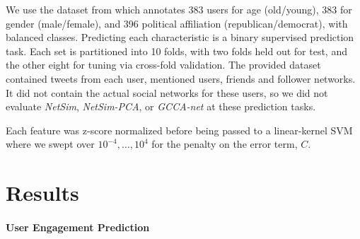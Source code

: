\documentclass{article}
\newcommand{\gccawnet}{\emph{GCCA-net}} %
\newcommand{\bowpcawnet}{\emph{NetSim-PCA}} %
\newcommand{\collab}{\emph{NetSim}} %
\newcommand{\myparagraph}[1]{\vspace{-.2cm}\paragraph{#1}}
\begin{document}
We use the dataset from 
which annotates 383 users for age (old/young), 383 for gender
(male/female), and 396 political affiliation (republican/democrat), with balanced classes.  Predicting each characteristic is a binary supervised prediction task.
Each set is partitioned into 10 folds, with two folds held out for test, and the other eight for tuning via cross-fold validation.
The provided dataset contained tweets from each user, mentioned users, friends and follower networks.  It did not contain the actual social
networks for these users, so we did not evaluate \collab, \bowpcawnet, or \gccawnet{} at these prediction tasks.

Each feature was z-score normalized before being passed to a linear-kernel SVM where we swept over $10^{-4}, \ldots, 10^{4}$ for the penalty on the error term, $C$.


\section{Results}
\label{results}

\myparagraph{User Engagement Prediction}
\end{document}
